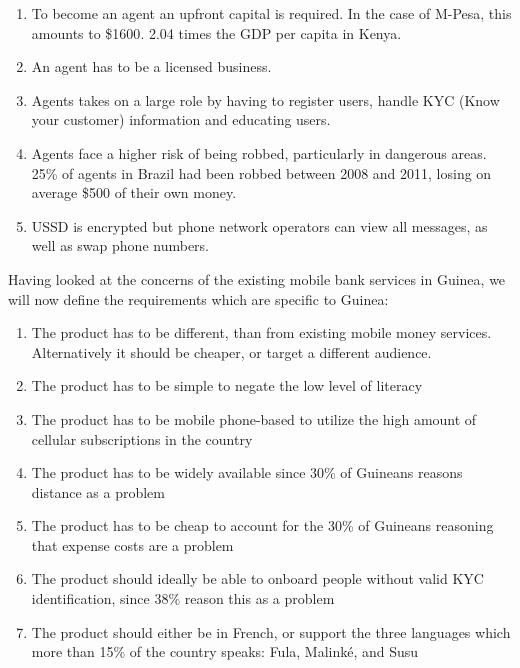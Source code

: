 \documentclass[11pt, a4paper]{article}
\begin{document}
\begin{enumerate}
  \item To become an agent an upfront capital is required. In the case of M-Pesa, this amounts to \$1600\cite{cgapreq}. 2.04 times the GDP per capita in Kenya\cite{cgapreq}.
  \item An agent has to be a licensed business\cite{cgapreq}.
  \item Agents takes on a large role by having to register users, handle KYC (Know your customer) information and educating users.
  \item Agents face a higher risk of being robbed, particularly in dangerous areas. 25\% of agents in Brazil had been robbed between 2008 and 2011, losing on average \$500 of their own money\cite{cgapreq}.
  \item USSD is encrypted but phone network operators can view all messages, as well as swap phone numbers.\\
\end{enumerate}

Having looked at the concerns of the existing mobile bank services in Guinea, we will now define the requirements which are specific to Guinea:

\begin{enumerate}
  \item The product has to be different, than from existing mobile money services. Alternatively it should be cheaper, or target a different audience.
  \item The product has to be simple to negate the low level of literacy
  \item The product has to be mobile phone-based to utilize the high amount of cellular subscriptions in the country
  \item The product has to be widely available since 30\% of Guineans reasons distance as a problem
  \item The product has to be cheap to account for the 30\% of Guineans reasoning that expense costs are a problem
  \item The product should ideally be able to onboard people without valid KYC identification, since 38\% reason this as a problem
  \item The product should either be in French, or support the three languages which more than 15\% of the country speaks: Fula, Malinké, and Susu
\end{enumerate}
\end{document}
